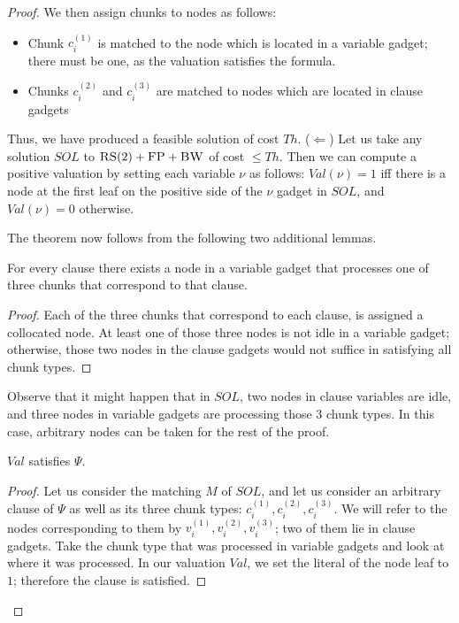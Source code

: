 \documentclass[9pt]{sigcomm-alternate}
\newcommand{\variab}{\nu}
\newcommand{\achunk}{\ensuremath{c}}
\newcommand{\FP}{\textsc{FP}}
\newcommand{\RS}{\textsc{RS}}
\newcommand{\BW}{\textsc{BW}}
\newcommand{\Formula}{\ensuremath{\Psi}}
\newcommand{\Thr}{\ensuremath{Th}}
\newcommand{\Val}{\ensuremath{Val}}
\newcommand{\Sol}{\ensuremath{SOL}}
\begin{document}
\begin{appendix}
\begin{proof}
We then assign chunks to nodes as follows:
\begin{itemize}
\item Chunk $\achunk_i^{(1)}$ is matched to the node which is located in a variable gadget; there
must be one, as the valuation satisfies the formula.
\item Chunks $\achunk_i^{(2)}$ and $\achunk_i^{(3)}$ are matched to nodes which 
are
located in clause
gadgets
\end{itemize}

Thus, we have produced a feasible solution of cost $\Thr$.
($\Leftarrow$)
Let us take any solution $\Sol$ to $\RS(2)+\FP+\BW$ of cost $\leq \Thr$.
Then we can compute a positive valuation by setting each variable $\variab$
as follows:
$\Val(\variab)= 1$ iff there is a node at the first leaf on the positive side of the $\variab$ gadget in $\Sol$,
and $\Val(\variab)=0$ otherwise.


The theorem now follows from the following two additional lemmas.
\begin{lemma}
For every clause there exists a node in a variable gadget that processes one of
  three chunks that correspond to that clause.
\end{lemma}
\begin{proof}
 Each of the three chunks that correspond to each clause,
 is assigned a collocated node.
 At least one of those three nodes is not idle in a variable gadget;
otherwise, those two nodes in the clause gadgets would not suffice in
satisfying all chunk types.
\end{proof}

Observe that it might happen that in $\Sol$, two nodes in
clause variables are idle, and three nodes in variable gadgets are
processing those $3$ chunk types. In this case,
arbitrary nodes can be taken for the rest
of the proof.

\begin{lemma}
$\Val$ satisfies $\Formula$.
\end{lemma}
\begin{proof}
Let us consider the matching $M$ of $\Sol$, and let us consider an arbitrary clause of
$\Formula$ as well as its three chunk types: $\achunk_i^{(1)}, \achunk_i^{(2)}, \achunk_i^{(3)}$.
We will refer to the nodes corresponding to them
by $v_i^{(1)}, v_i^{(2)}, v_i^{(3)}$; two of them lie in clause gadgets.
Take the chunk type that was processed in variable
gadgets and look at where it was processed.
In our valuation $\Val$, we set the literal of the node leaf to
$1$; therefore the clause is satisfied.
\end{proof}
\end{proof}


\end{appendix}
\end{document}
